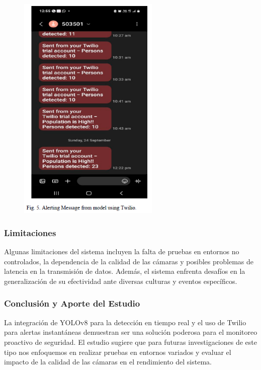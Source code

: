 \begin{figure}[h] %
    \centering
    \includegraphics[width=0.6\textwidth]{4/re1.png} %
    \label{fig:ejemplo} %
\end{figure}

\clearpage


\subsubsection{Limitaciones}
Algunas limitaciones del sistema incluyen la falta de pruebas en entornos no controlados, la dependencia de la calidad de las cámaras y posibles problemas de latencia en la transmisión de datos. Además, el sistema enfrenta desafíos en la generalización de su efectividad ante diversas culturas y eventos específicos.

\subsubsection{Conclusión y Aporte del Estudio}
La integración de YOLOv8 para la detección en tiempo real y el uso de Twilio para alertas instantáneas demuestran ser una solución poderosa para el monitoreo proactivo de seguridad. El estudio sugiere que para futuras investigaciones de este tipo nos enfoquemos en realizar pruebas en entornos variados y evaluar el impacto de la calidad de las cámaras en el rendimiento del sistema.



